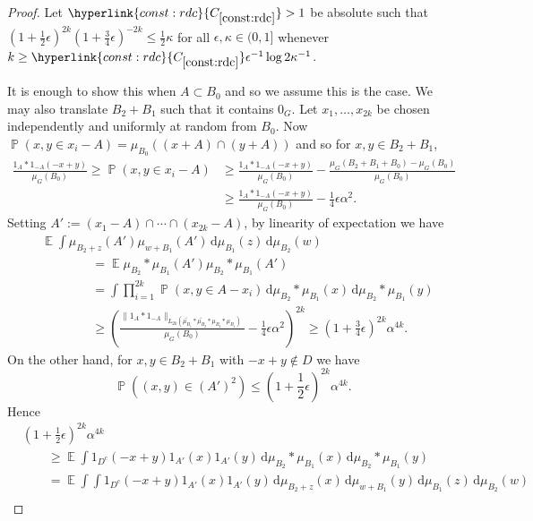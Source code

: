 \documentclass[12pt,reqno]{amsart}
\providecommand{\E}{\mathop{\mathbb{E}}}
\renewcommand{\P}{\mathop{\mathbb{P}}}
\providecommand{\wt}{\widetilde}
\newcommand{\dd}{\,\mathrm{d}}
\numberwithin{equation}{section}
\newcommand{\refconstbig}[1]{%
    \hyperlink{const:#1}{C_{\ref{const:#1}}}%
}
\begin{document}
\begin{proof}
Let $\refconstbig{rdc}>1$ be absolute such that $(1+\frac{1}{2}\epsilon)^{2k}(1+\frac{3}{4}\epsilon)^{-2k} \leq \frac{1}{2}\kappa$ for all $\epsilon,\kappa \in (0,1]$ whenever $k \geq \refconstbig{rdc}\epsilon^{-1}\log 2\kappa^{-1}$.

It is enough to show this when $A \subset {B_0}$ and so we assume this is the case. We may also translate $B_2+B_1$ such that it contains $0_G$.  Let $x_1,\dots,x_{2k}$ be chosen independently and uniformly at random from ${B_0}$. Now $\P(x,y \in x_i-A)=\mu_{B_0}((x+A) \cap (y+A))$ and so for $x,y \in B_2+B_1$,
\begin{align*}
 \frac{1_A \ast 1_{-A}(-x+y)}{\mu_G({B_0})} \geq \P(x,y \in x_i-A) & \geq  \frac{1_A \ast 1_{-A}(-x+y)}{\mu_G({B_0})} -\frac{\mu_G(B_2+B_1+{B_0})-\mu_G({B_0})}{\mu_G({B_0})} \\ & \geq \frac{1_A \ast 1_{-A}(-x+y)}{\mu_G({B_0})}-\frac{1}{4}\epsilon \alpha^2.
\end{align*}
Setting $A':=(x_1-A) \cap \cdots \cap (x_{2k}-A)$, by linearity of expectation we have
\begin{align}
\nonumber &\E{\int{ \mu_{B_2+z}(A')\mu_{w+B_1}(A') \dd \mu_{B_1}(z)\dd\mu_{B_2}(w)}}\\ \nonumber & \qquad \qquad =\E{\mu_{B_2}\ast \mu_{B_1}(A')\mu_{B_2} \ast \mu_{B_1}(A')}\\ \nonumber & \qquad \qquad = \int{\prod_{i=1}^{2k}{\P(x,y \in A-x_i)}\dd\mu_{B_2} \ast \mu_{B_1}(x)\dd\mu_{B_2} \ast \mu_{B_1}(y)}\\  \label{eqn.sizelower} & \qquad \qquad  \geq \left(\frac{\|1_A \ast 1_{-A}\|_{L_{2k}( \wt{\mu_{B_1}}\ast \wt{\mu_{B_2}}\ast \mu_{B_2} \ast \mu_{B_1} )}}{\mu_G({B_0})} -\frac{1}{4}\epsilon \alpha^2\right)^{2k} \geq \left(1+\frac{3}{4}\epsilon\right)^{2k}\alpha^{4k}.
\end{align}
On the other hand, for $x,y \in B_2+B_1$ with $-x+y \not \in D$ we have 
 \begin{equation*}
 \P((x,y) \in (A')^2) \leq \left(1+\frac{1}{2}\epsilon\right)^{2k}\alpha^{4k}.
 \end{equation*}
 Hence
 \begin{align}
\nonumber &  \left(1+\frac{1}{2}\epsilon\right)^{2k}\alpha^{4k}\\ \nonumber &\qquad  \geq \E{ \int{1_{D^c}(-x+y)1_{A'}(x)1_{A'}(y)\dd\mu_{B_2}\ast \mu_{B_1}(x)\dd \mu_{B_2}\ast \mu_{B_1}(y)}}\\ \nonumber  &\qquad   =\E{ \int{\int{1_{D^c}(-x+y)1_{A'}(x)1_{A'}(y)\dd \mu_{B_2+z}(x) \dd \mu_{w+B_1}(y)}\dd \mu_{B_1}(z)\dd \mu_{B_2}(w)}}\\

\end{align}
\end{proof}
\end{document}
